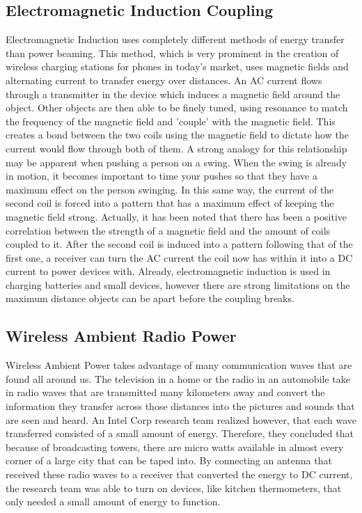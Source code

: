 \documentclass{article}
\begin{document}
\subsection{Electromagnetic Induction Coupling}
Electromagnetic Induction uses completely different methods of energy transfer than power beaming. This method, which is very prominent in the creation of wireless charging stations for phones in today's market, uses magnetic fields and alternating current to transfer energy over distances. An AC current flows through a transmitter in the device which induces a magnetic field around the object. Other objects are then able to be finely tuned, using resonance to match the frequency of the magnetic field and 'couple' with the magnetic field. This creates a bond between the two coils using the magnetic field to dictate how the current would flow through both of them. A strong analogy for this relationship may be apparent when pushing a person on a swing. When the swing is already in motion, it becomes important to time your pushes so that they have a maximum effect on the person swinging. In this same way, the current of the second coil is forced into a pattern that has a maximum effect of keeping the magnetic field strong. Actually, it has been noted that there has been a positive correlation between the strength of a magnetic field and the amount of coils coupled to it. After the second coil is induced into a pattern following that of the first one, a receiver can turn the AC current the coil now has within it into a DC current to power devices with. Already, electromagnetic induction is used in charging batteries and small devices, however there are strong limitations on the maximum distance objects can be apart before the coupling breaks.

\subsection {Wireless Ambient Radio Power}
Wireless Ambient Power takes advantage of many communication waves that are found all around us. The television in a home or the radio in an automobile take in radio waves that are transmitted many kilometers away and convert the information they transfer across those distances into the pictures and sounds that are seen and heard. An Intel Corp research team realized however, that each wave transferred consisted of a small amount of energy. Therefore, they concluded that because of broadcasting towers, there are micro watts available in almost every corner of a large city that can be taped into. By connecting an antenna that received these radio waves to a receiver that converted the energy to DC current, the research team was able to turn on devices, like kitchen thermometers, that only needed a small amount of energy to function. 
\end{document}
